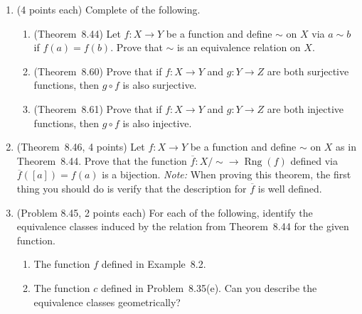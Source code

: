 \documentclass[11pt]{article}
\theoremstyle{definition}
\DeclareMathOperator{\range}{Rng}
\begin{document}
\begin{enumerate}

\item (4 points each) Complete  of the following.
\begin{enumerate}

\item (Theorem~8.44) Let $f:X\to Y$ be a function and define $\sim$ on $X$ via $a\sim b$ if $f(a) = f(b)$. Prove that $\sim$ is an equivalence relation on $X$.
\item (Theorem~8.60) Prove that if $f:X\to Y$ and $g:Y\to Z$ are both surjective functions, then $g\circ f$ is also surjective.
\item (Theorem~8.61) Prove that if $f:X\to Y$ and $g:Y\to Z$ are both injective functions, then $g\circ f$ is also injective.
\end{enumerate}

\item (Theorem~8.46, 4 points) Let $f:X\to Y$ be a function and define $\sim$ on $X$ as in Theorem~8.44. Prove that the function $\overline{f}:X/{\sim}\to \range(f)$ defined via $\overline{f}([a]) = f(a)$ is a bijection. \emph{Note:} When proving this theorem, the first thing you should do is verify that the description for $\overline{f}$ is well defined.

\item (Problem 8.45, 2 points each) For each of the following, identify the equivalence classes induced by the relation from Theorem~8.44 for the given function.
\begin{enumerate}[label=\textrm{(\alph*)}]
\item The function $f$ defined in Example~8.2.
\item The function $c$ defined in Problem~8.35(e). Can you describe the equivalence classes geometrically?
\end{enumerate}

\end{enumerate}
\end{document}
